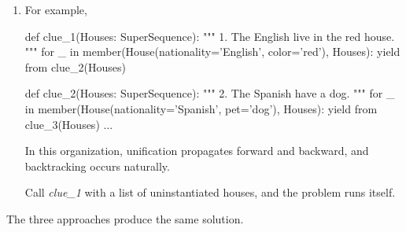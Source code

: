 \begin{enumerate}
\item {} For example, 

\begin{minipage}{\linewidth}
\begin{python}
  def clue_1(Houses: SuperSequence):
    """ 1. The English live in the red house.  """
    for _ in member(House(nationality='English', color='red'), Houses):
      yield from clue_2(Houses)

  def clue_2(Houses: SuperSequence):
    """ 2. The Spanish have a dog. """
    for _ in member(House(nationality='Spanish', pet='dog'), Houses):
      yield from clue_3(Houses)
  ...
\end{python}
\end{minipage}

In this organization, unification propagates forward and backward, and backtracking occurs naturally.

Call \textit{clue\_1} with a list of uninstantiated houses, and the problem runs itself.
\end{enumerate}
\smallv 

The three approaches produce the same solution.


